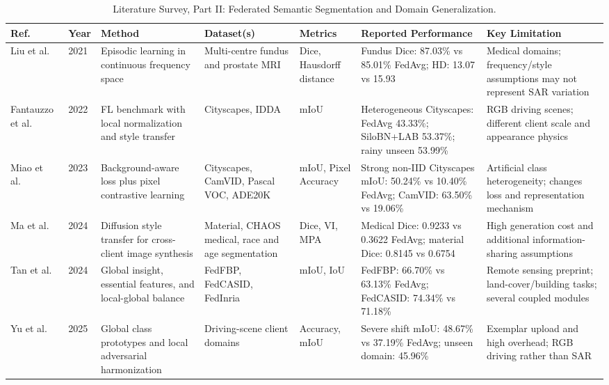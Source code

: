 \documentclass[conference]{IEEEtran}
\begin{document}
\begin{table}[t]
\centering
\caption{Literature Survey, Part II: Federated Semantic Segmentation and Domain Generalization.}
\label{tab:lit_seg}
\small
\begin{tabularx}{\textwidth}{p{1.8cm}p{0.8cm}p{3.2cm}p{2.8cm}p{2.2cm}p{3.2cm}X}
\toprule
\textbf{Ref.} & \textbf{Year} & \textbf{Method} & \textbf{Dataset(s)} & \textbf{Metrics} & \textbf{Reported Performance} & \textbf{Key Limitation} \\
\midrule
Liu et al.~\cite{liu2021feddg} & 2021 & Episodic learning in continuous frequency space & Multi-centre fundus and prostate MRI & Dice, Hausdorff distance & Fundus Dice: 87.03\% vs 85.01\% FedAvg; HD: 13.07 vs 15.93 & Medical domains; frequency/style assumptions may not represent SAR variation \\
Fantauzzo et al.~\cite{fantauzzo2022feddrive} & 2022 & FL benchmark with local normalization and style transfer & Cityscapes, IDDA & mIoU & Heterogeneous Cityscapes: FedAvg 43.33\%; SiloBN+LAB 53.37\%; rainy unseen 53.99\% & RGB driving scenes; different client scale and appearance physics \\
Miao et al.~\cite{miao2023fedseg} & 2023 & Background-aware loss plus pixel contrastive learning & Cityscapes, CamVID, Pascal VOC, ADE20K & mIoU, Pixel Accuracy & Strong non-IID Cityscapes mIoU: 50.24\% vs 10.40\% FedAvg; CamVID: 63.50\% vs 19.06\% & Artificial class heterogeneity; changes loss and representation mechanism \\
Ma et al.~\cite{ma2024fedst} & 2024 & Diffusion style transfer for cross-client image synthesis & Material, CHAOS medical, race and age segmentation & Dice, VI, MPA & Medical Dice: 0.9233 vs 0.3622 FedAvg; material Dice: 0.8145 vs 0.6754 & High generation cost and additional information-sharing assumptions \\
Tan et al.~\cite{tan2024bridging} & 2024 & Global insight, essential features, and local-global balance & FedFBP, FedCASID, FedInria & mIoU, IoU & FedFBP: 66.70\% vs 63.13\% FedAvg; FedCASID: 74.34\% vs 71.18\% & Remote sensing preprint; land-cover/building tasks; several coupled modules \\
Yu et al.~\cite{yu2025fedsaas} & 2025 & Global class prototypes and local adversarial harmonization & Driving-scene client domains & Accuracy, mIoU & Severe shift mIoU: 48.67\% vs 37.19\% FedAvg; unseen domain: 45.96\% & Exemplar upload and high overhead; RGB driving rather than SAR \\
\bottomrule
\end{tabularx}
\end{table}
\end{document}
